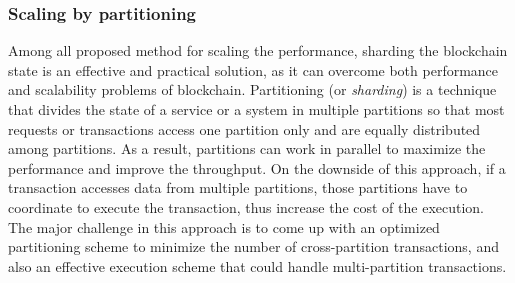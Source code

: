\subsubsection{Scaling by partitioning}
Among all proposed method for scaling the performance, sharding the blockchain
state is an effective and practical solution, as it can overcome both
performance and scalability problems of blockchain. Partitioning (or
\emph{sharding}) is a technique that divides the state of a service or a system
in multiple partitions so that most requests or transactions access one
partition only and are equally distributed among partitions. As a result,
partitions can work in parallel to maximize the performance and improve the
throughput. On the downside of this approach, if a transaction accesses data
from multiple partitions, those partitions have to coordinate to execute the
transaction, thus increase the cost of the execution. The major challenge in
this approach is to come up with an optimized partitioning scheme to minimize
the number of cross-partition transactions, and also an effective execution
scheme that could handle multi-partition transactions.


